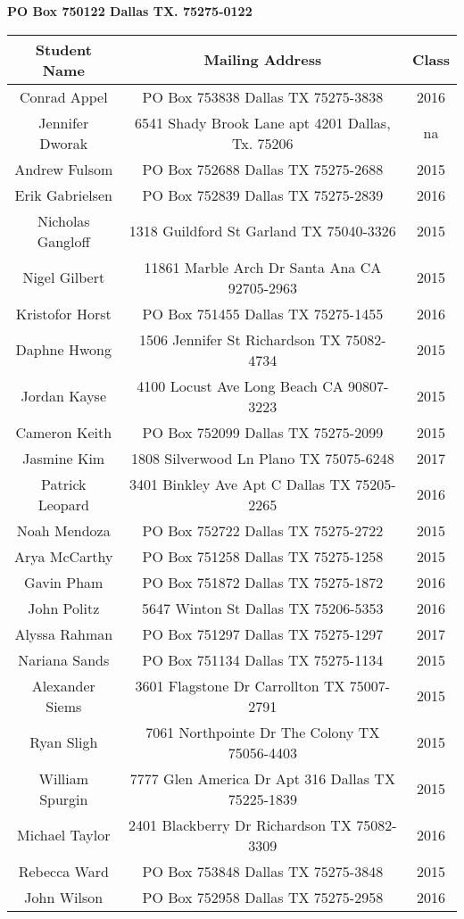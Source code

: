 \documentclass{letter}
\begin{document}
\begin{center}
\textbf{PO Box  750122 Dallas TX. 75275-0122} \\ \vspace{2em} 


\begin{tabular}{| c | c | c |}
\hline
\textbf{Student Name} & \textbf{Mailing Address} & \textbf{Class}\\
\hline
\hline
Conrad Appel&PO Box 753838   Dallas  TX  75275-3838&2016\\
\hline
Jennifer Dworak&6541 Shady Brook Lane apt 4201 Dallas, Tx. 75206&na\\
\hline
Andrew Fulsom&PO Box 752688   Dallas  TX  75275-2688&2015\\
\hline
Erik Gabrielsen&PO Box 752839   Dallas  TX  75275-2839&2016\\
\hline
Nicholas Gangloff&1318 Guildford St   Garland TX  75040-3326&2015\\
\hline
Nigel Gilbert&11861 Marble Arch Dr    Santa Ana   CA  92705-2963&2015\\
\hline
Kristofor Horst&PO Box 751455   Dallas  TX  75275-1455&2016\\
\hline
Daphne Hwong&1506 Jennifer St    Richardson  TX  75082-4734&2015\\
\hline
Jordan Kayse&4100 Locust Ave Long Beach  CA  90807-3223&2015\\
\hline
Cameron Keith&PO Box 752099   Dallas  TX  75275-2099&2015\\
\hline
Jasmine Kim&1808 Silverwood Ln  Plano   TX  75075-6248&2017\\
\hline
Patrick Leopard&3401 Binkley Ave Apt C  Dallas  TX  75205-2265&2016\\
\hline
Noah Mendoza&PO Box 752722   Dallas  TX  75275-2722&2015\\
\hline
Arya McCarthy&PO Box 751258   Dallas  TX  75275-1258&2015\\
\hline
Gavin Pham&PO Box 751872   Dallas  TX  75275-1872&2016\\
\hline
John Politz&5647 Winton St  Dallas  TX  75206-5353&2016\\
\hline
Alyssa Rahman&PO Box 751297   Dallas  TX  75275-1297&2017\\
\hline
Nariana Sands&PO Box 751134   Dallas  TX  75275-1134&2015\\
\hline
Alexander Siems&3601 Flagstone Dr   Carrollton  TX  75007-2791&2015\\
\hline
Ryan Sligh&7061 Northpointe Dr The Colony  TX  75056-4403&2015\\
\hline
William Spurgin&7777 Glen America Dr Apt 316    Dallas  TX  75225-1839&2015\\
\hline
Michael Taylor&2401 Blackberry Dr  Richardson  TX  75082-3309&2016\\
\hline
Rebecca Ward&PO Box 753848   Dallas  TX  75275-3848&2015\\
\hline
John Wilson&PO Box 752958   Dallas  TX  75275-2958&2016\\
\hline
\end{tabular}

\end{center}
\end{document}
